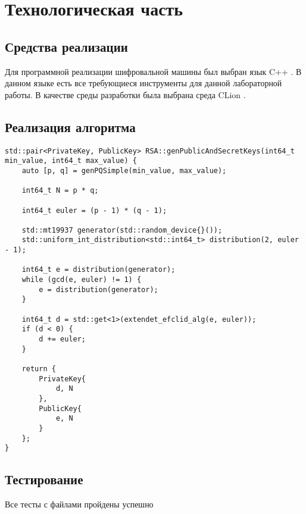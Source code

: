 \chapter{Технологическая часть}

\section{Средства реализации}

Для программной реализации шифровальной машины был выбран язык C++ \cite{cpp}.
В данном языке есть все требующиеся инструменты для данной лабораторной работы.
В качестве среды разработки была выбрана среда CLion \cite{clion}.

\section{Реализация алгоритма}

\begin{lstlisting}[label=lst:aes,caption=Генерация ключей RSA]
std::pair<PrivateKey, PublicKey> RSA::genPublicAndSecretKeys(int64_t min_value, int64_t max_value) {
	auto [p, q] = genPQSimple(min_value, max_value);
	
	int64_t N = p * q;
	
	int64_t euler = (p - 1) * (q - 1);
	
	std::mt19937 generator(std::random_device{}());
	std::uniform_int_distribution<std::int64_t> distribution(2, euler - 1);
	
	int64_t e = distribution(generator);
	while (gcd(e, euler) != 1) {
		e = distribution(generator);
	}
	
	int64_t d = std::get<1>(extendet_efclid_alg(e, euler));
	if (d < 0) {
		d += euler;
	}
	
	return {
		PrivateKey{
			d, N
		},
		PublicKey{
			e, N
		}
	};
}
\end{lstlisting}

\section{Тестирование}
Все тесты с файлами пройдены успешно

